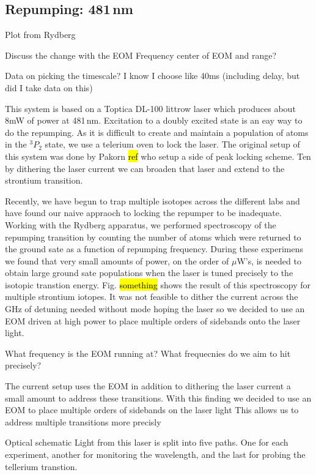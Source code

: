 \subsection{Repumping: 481\,nm}
\label{ssec:481sys}

Plot from Rydberg

Discuss the change with the EOM
	Frequency center of EOM and range?
	
Data on picking the timescale?
	I know I choose like 40ms (including delay, but did I take data on this)

This system is based on a Toptica DL-100 littrow laser which produces about 8mW of power at 481\,nm. 
Excitation to a doubly excited state is an eay way to do the repumping.
As it is difficult to create and maintain a population of atoms in the $^3P_2$ state, we use a telerium oven to lock the laser.
The original setup of this system was done by Pakorn \hl{ref} who setup a side of peak locking scheme. 
Ten by dithering the laser current we can broaden that laser and extend to the strontium transition.

Recently, we have begun to trap multiple isotopes across the different labs and have found our naive appraoch to locking the repumper to be inadequate.
Working with the Rydberg apparatus, we performed spectroscopy of the repumping transition by counting the number of atoms which were returned to the ground sate as a function of repumping frequency.
During these experimens we found that very small amounts of power, on the order of $\mu$W's, is needed to obtain large ground sate populations when the laser is tuned precisely to the isotopic transtion energy. 
Fig. \hl{something} shows the result of this spectroscopy for multiple strontium iotopes.
It was not feasible to dither the current across the GHz of detuning needed without mode hoping the laser so we decided to use an EOM driven at high power to place multiple orders of sidebands onto the laser light.

What frequency is the EOM running at?
What frequecnies do we aim to hit precisely?

The current setup uses the EOM in addition to dithering the laser current a small amount to address these transitions.
With this finding we decided to use an EOM to place multiple orders of sidebands on the laser light
This allows us to address multiple transitions more precisly

Optical schematic
Light from this laser is split into five paths.
One for each experiment, another for monitoring the wavelength, and the last for probing the tellerium transtion.

